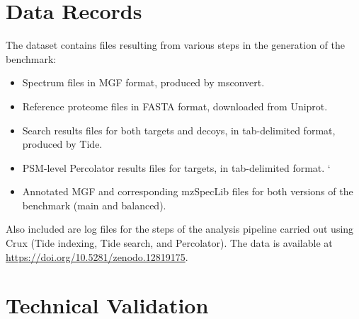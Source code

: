 \documentclass{article}
\begin{document}
\section*{Data Records}

The dataset contains files resulting from various steps in the generation of the benchmark:
\begin{itemize}
\item Spectrum files in MGF format, produced by msconvert.
\item Reference proteome files in FASTA format, downloaded from Uniprot.
\item Search results files for both targets and decoys, in tab-delimited format, produced by Tide.
\item PSM-level Percolator results files for targets, in tab-delimited format.
`\item Annotated MGF and corresponding mzSpecLib \cite{klein2024proteomics} files for both versions of the benchmark (main and balanced).
\end{itemize}
Also included are log files for the steps of the analysis pipeline carried out using Crux \cite{park2008rapid} (Tide indexing, Tide search, and Percolator).
The data is available at \url{https://doi.org/10.5281/zenodo.12819175}.

\section*{Technical Validation}
\end{document}
